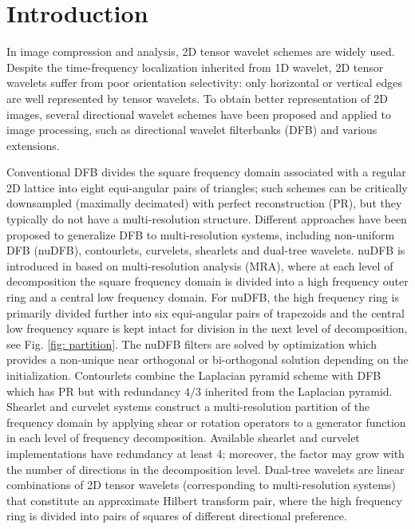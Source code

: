 \section{Introduction}

\iffalse
\begin{itemize}
\item review construction of directional wavelet, shearlet
\item what's new in our construction?
\item summary: framework, technique, reference(Durand, Cohen)
\item organization of the paper
\end{itemize}
\fi

In image compression and analysis, 2D tensor wavelet schemes are widely used. Despite the time-frequency localization inherited from 1D wavelet, 2D tensor wavelets suffer from poor orientation selectivity: only horizontal or vertical edges are well represented by tensor wavelets. To obtain better representation of 2D images, several directional wavelet schemes have been proposed and applied to image processing, such as directional wavelet filterbanks (DFB) and various extensions.

Conventional DFB \cite{DFB92} divides the square frequency domain associated with a regular 2D lattice into eight equi-angular pairs of triangles; such schemes can be critically downsampled (maximally decimated) with perfect reconstruction (PR), but they typically do not have a multi-resolution structure. 
Different approaches have been proposed to generalize DFB to multi-resolution systems, including non-uniform DFB (nuDFB), contourlets, curvelets, shearlets and dual-tree wavelets.
nuDFB is introduced in \cite{nuDFB05} based on multi-resolution analysis (MRA), where at each level of decomposition the square frequency domain is divided into a high frequency outer ring and a central low frequency domain. For nuDFB, the high frequency ring is primarily divided further into six equi-angular pairs of trapezoids and the central low frequency square is kept intact for division in the next level of decomposition, see Fig. \ref{fig: partition}. The nuDFB filters are solved by optimization which provides a non-unique near orthogonal or bi-orthogonal solution depending on the initialization.
Contourlets \cite{do2005contourlet} combine the Laplacian pyramid scheme with DFB which has PR but with redundancy $4/3$ inherited from the Laplacian pyramid.
Shearlet \cite{shearlet12book,easley2008sparse} and curvelet \cite{candes2006fast} systems construct a multi-resolution partition of the frequency domain by applying shear or rotation operators to a generator function in each level of frequency decomposition. Available shearlet and curvelet implementations have redundancy at least 4; moreover, the factor may grow with the number of directions in the decomposition level.
Dual-tree wavelets \cite{selesnick2005dual} are linear combinations of 2D tensor wavelets (corresponding to multi-resolution systems) that constitute an approximate Hilbert transform pair, where the high frequency ring is divided into pairs of squares of different directional preference.

